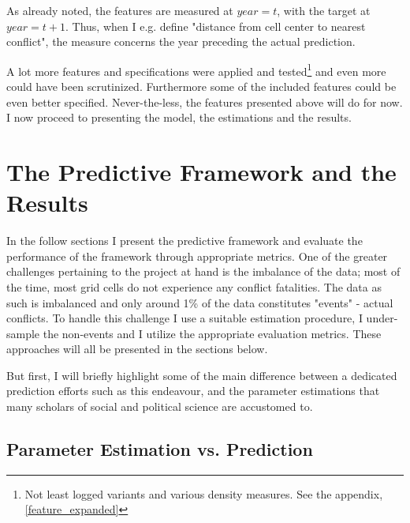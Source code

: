 \documentclass[a4paper]{article}
\begin{document}
As already noted, the features are measured at $year = t$, with the target at $year = t+1$. Thus, when I e.g. define "distance from cell center to nearest conflict", the measure concerns the year preceding the actual prediction.\par

A lot more features and specifications were applied and tested\footnote{Not least logged variants and various density measures. See the appendix, \autoref{feature_expanded}} and even more could have been scrutinized. Furthermore some of the included features could be even better specified. Never-the-less, the features presented above will do for now. I now proceed to presenting the model, the estimations and the results.

\section{The Predictive Framework and the Results}

In the follow sections I present the predictive framework and evaluate the performance of the framework through appropriate metrics. One of the greater challenges pertaining to the project at hand is the imbalance of the data; most of the time, most grid cells do not experience any conflict fatalities. The data as such is imbalanced and only around 1\% of the data constitutes "events" - actual conflicts. To handle this challenge I use a suitable estimation procedure, I under-sample the non-events and I utilize the appropriate evaluation metrics. These approaches will all be presented in the sections below.\par

But first, I will briefly highlight some of the main difference between a dedicated prediction efforts such as this endeavour, and the parameter estimations that many scholars of social and political science are accustomed to.\par

\subsection{Parameter Estimation vs. Prediction}
\end{document}
